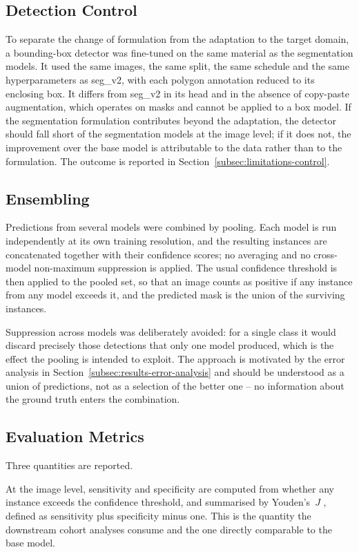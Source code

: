 \subsection{Detection Control}
\label{subsec:detection-control}
To separate the change of formulation from the adaptation to the target domain, a bounding-box
detector was fine-tuned on the same material as the segmentation models. It used the same images,
the same split, the same schedule and the same hyperparameters as seg\_v2, with each polygon
annotation reduced to its enclosing box. It differs from seg\_v2 in its head and in the absence
of copy-paste augmentation, which operates on masks and cannot be applied to a box model. If the
segmentation formulation contributes beyond the adaptation, the detector should fall short of the
segmentation models at the image level; if it does not, the improvement over the base model is
attributable to the data rather than to the formulation. The outcome is reported in
Section~\ref{subsec:limitations-control}.

\subsection{Ensembling}
\label{subsec:ensembling}
Predictions from several models were combined by pooling. Each model is run independently at its
own training resolution, and the resulting instances are concatenated together with their
confidence scores; no averaging and no cross-model non-maximum suppression is applied. The usual
confidence threshold is then applied to the pooled set, so that an image counts as positive if any
instance from any model exceeds it, and the predicted mask is the union of the surviving
instances.

Suppression across models was deliberately avoided: for a single class it would discard precisely
those detections that only one model produced, which is the effect the pooling is intended to
exploit. The approach is motivated by the error analysis in
Section~\ref{subsec:results-error-analysis} and should be understood as a union of predictions,
not as a selection of the better one -- no information about the ground truth enters the
combination.

\subsection{Evaluation Metrics}
\label{subsec:metrics}
Three quantities are reported.

At the image level, sensitivity and specificity are computed from whether any instance exceeds the
confidence threshold, and summarised by Youden's~$J$ \cite{youden1950index}, defined as
sensitivity plus specificity minus one. This is the quantity the downstream cohort analyses
consume and the one directly comparable to the base model.

